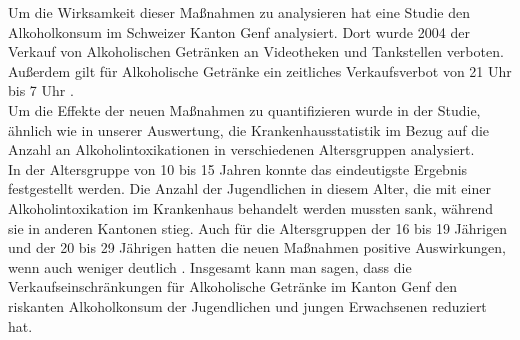 \documentclass[12pt]{article}
\begin{document}
Um die Wirksamkeit dieser Maßnahmen zu analysieren hat eine Studie den Alkoholkonsum im Schweizer Kanton Genf analysiert. Dort wurde 2004 der Verkauf von Alkoholischen Getränken an Videotheken und Tankstellen verboten. Außerdem gilt für Alkoholische Getränke ein zeitliches Verkaufsverbot von 21 Uhr bis 7 Uhr \autocite[27]{hagen_verkaufseinschrankungen_2011}. \\%
Um die Effekte der neuen Maßnahmen zu quantifizieren wurde in der Studie, ähnlich wie in unserer Auswertung, die Krankenhausstatistik im Bezug auf die Anzahl an Alkoholintoxikationen in verschiedenen Altersgruppen analysiert.\\
In der Altersgruppe von 10 bis 15 Jahren konnte das eindeutigste Ergebnis festgestellt werden. Die Anzahl der Jugendlichen in diesem Alter, die mit einer Alkoholintoxikation im Krankenhaus behandelt werden mussten sank, während sie in anderen Kantonen stieg. Auch für die Altersgruppen der 16 bis 19 Jährigen und der 20 bis 29 Jährigen hatten die neuen Maßnahmen positive Auswirkungen, wenn auch weniger deutlich \autocite[28]{hagen_verkaufseinschrankungen_2011}. Insgesamt kann man sagen, dass die Verkaufseinschränkungen für Alkoholische Getränke im Kanton Genf den riskanten Alkoholkonsum der Jugendlichen und jungen Erwachsenen reduziert hat. 
\end{document}
